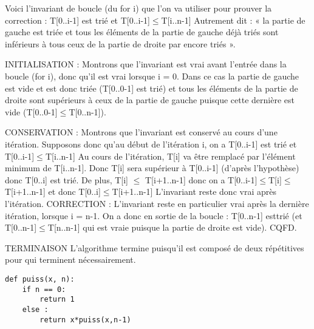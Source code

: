 \begin{multicols}{2}
\ifprof
Voici l’invariant de boucle (du for i) que l’on va utiliser pour prouver la correction :
T[0..i-1] est trié et T[0..i-1]$\leq$T[i..n-1]
Autrement dit : « la partie de gauche est triée et tous les éléments de la partie de
gauche déjà triés sont inférieurs à tous ceux de la partie de droite par encore triés ».

INITIALISATION : Montrons que l’invariant est vrai avant l’entrée dans la boucle (for
i), donc qu’il est vrai lorsque i = 0. Dans ce cas la partie de gauche est vide et est donc
triée (T[0..0-1] est trié) et tous les éléments de la partie de droite sont supérieurs à ceux
de la partie de gauche puisque cette dernière est vide (T[0..0-1]$\leq$T[0..n-1]).

CONSERVATION : Montrons que l’invariant est conservé au cours d’une itération.
Supposons donc qu’au début de l’itération i, on a T[0..i-1] est trié et T[0..i-1]$\leq$T[i..n-1]
Au cours de l’itération, T[i] va être remplacé par l’élément minimum de T[i..n-1]. Donc
T[i] sera supérieur à T[0..i-1] (d’après l’hypothèse) donc T[0..i] est trié. De plus, T[i] $\leq$
T[i+1..n-1] donc on a T[0..i-1]$\leq$T[i]$\leq$T[i+1..n-1] et donc T[0..i]$\leq$T[i+1..n-1]
L’invariant reste donc vrai après l’itération.
CORRECTION : L’invariant reste en particulier vrai après la dernière itération, lorsque i
= n-1. On a donc en sortie de la boucle : T[0..n-1] esttrié (et T[0..n-1]$\leq$T[n..n-1] qui
est vraie puisque la partie de droite est vide). CQFD.

TERMINAISON 
L’algorithme termine puisqu’il est composé de deux répétitives pour qui terminent
nécessairement.

\else
\fi


\exer{}
\setcounter{numques}{0}

\begin{lstlisting}
def puiss(x, n):
    if n == 0:
        return 1
    else :
        return x*puiss(x,n-1)
\end{lstlisting}


\ifprof
\else
\end{multicols}
\fi

